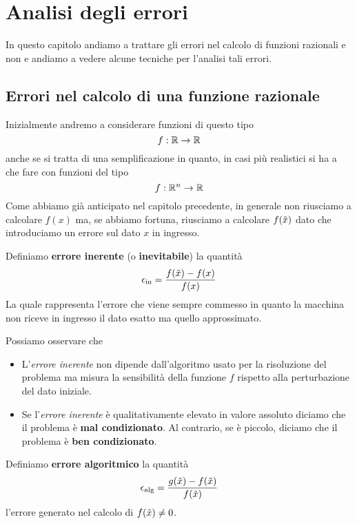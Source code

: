 \chapter{Analisi degli errori}
In questo capitolo andiamo a trattare gli errori nel calcolo di funzioni razionali e non e andiamo a vedere
alcune tecniche per l'analisi tali errori.

\section{Errori nel calcolo di una funzione razionale}
Inizialmente andremo a considerare funzioni di questo tipo
\[ f : \mathbb{R} \to \mathbb{R}\]
anche se si tratta di una semplificazione in quanto, in casi più realistici si ha a che fare con funzioni del tipo
\[ f : \mathbb{R}^n \to \mathbb{R} \]
Come abbiamo già anticipato nel capitolo precedente, in generale non riusciamo a calcolare $f(x)$ ma, se abbiamo
fortuna, riusciamo a calcolare $f(\tilde{x})$ dato che introduciamo un errore sul dato $x$ in ingresso.

\begin{definition}
	Definiamo \textbf{errore inerente} (o \textbf{inevitabile}) la quantità
	\[ \epsilon_{\text{in}} = \frac{f(\tilde{x}) - f(x)}{f(x)} \]
	La quale rappresenta l'errore che viene sempre commesso in quanto la macchina non riceve in ingresso
	il dato esatto ma quello approssimato.
\end{definition}

\begin{observation}
	Possiamo osservare che
	\begin{itemize}
		\item L'\emph{errore inerente} non dipende dall'algoritmo usato per la risoluzione del problema ma
		      misura la sensibilità della funzione $f$ rispetto alla perturbazione del dato iniziale.
		\item Se l'\emph{errore inerente} è qualitativamente elevato in valore assoluto diciamo che il problema
		      è \textbf{mal condizionato}. Al contrario, se è piccolo, diciamo che il problema è
		      \textbf{ben condizionato}.
	\end{itemize}
\end{observation}

\begin{definition}
	Definiamo \textbf{errore algoritmico} la quantità
	\[ \epsilon_{\text{alg}} = \frac{g(\tilde{x}) - f(\tilde{x})}{f(\tilde{x})} \]
	l'errore generato nel calcolo di $f(\tilde{x}) \neq 0$.
\end{definition}

